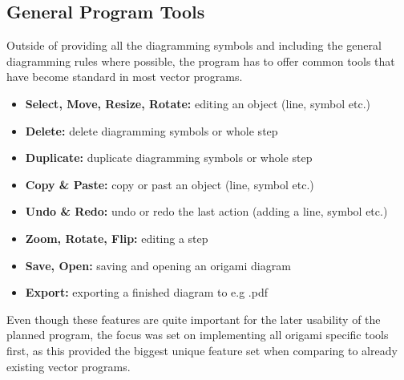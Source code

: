 \subsection{General Program Tools}
\label{sec:generalProgramTools}

Outside of providing all the diagramming symbols and including the general diagramming rules where possible, the program has to offer common tools that have become standard in most vector programs.
\begin{itemize}
	\item \textbf{Select, Move, Resize, Rotate:} editing an object (line, symbol etc.)
	\item \textbf{Delete:} delete diagramming symbols or whole step
	\item \textbf{Duplicate:} duplicate diagramming symbols or whole step
	\item \textbf{Copy \& Paste:} copy or past an object (line, symbol etc.)
	\item \textbf{Undo \& Redo:} undo or redo the last action (adding a line, symbol etc.)
	\item \textbf{Zoom, Rotate, Flip:} editing a step
	\item \textbf{Save, Open:} saving and opening an origami diagram
	\item \textbf{Export:} exporting a finished diagram to e.g .pdf
\end{itemize}
Even though these features are quite important for the later usability of the planned program, the focus was set on implementing all origami specific tools first, as this provided the biggest unique feature set when comparing to already existing vector programs.